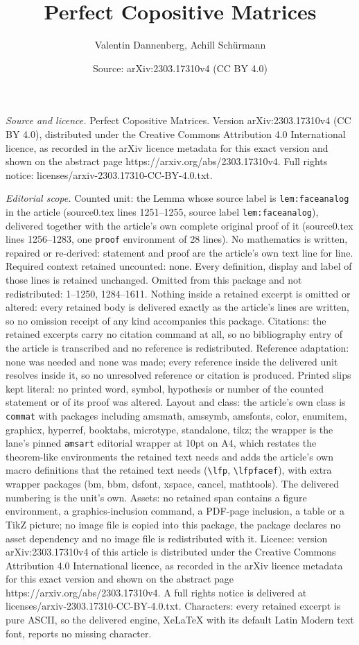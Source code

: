 \documentclass[10pt,a4paper]{amsart}
\title[Perfect Copositive Matrices]{Perfect Copositive Matrices}
\author{Valentin Dannenberg, Achill Sch\"urmann}
\date{Source: arXiv:2303.17310v4 (CC BY 4.0)}
\begin{document}
\maketitle

\noindent\emph{Source and licence.} Perfect Copositive Matrices. Version arXiv:2303.17310v4 (CC BY 4.0), distributed under the Creative Commons Attribution 4.0 International licence, as recorded in the arXiv licence metadata for this exact version and shown on the abstract page https://arxiv.org/abs/2303.17310v4. Full rights notice: licenses/arxiv-2303.17310-CC-BY-4.0.txt.\par\smallskip

\noindent\textit{Editorial scope.} Counted unit: the Lemma whose source label is \texttt{lem:faceanalog} in the article (source0.tex lines 1251--1255, source label \texttt{lem:faceanalog}), delivered together with the article's own complete original proof of it (source0.tex lines 1256--1283, one \texttt{proof} environment of 28 lines). No mathematics is written, repaired or re-derived: statement and proof are the article's own text line for line. Required context retained uncounted: none. Every definition, display and label of those lines is retained unchanged. Omitted from this package and not redistributed: 1--1250, 1284--1611. Nothing inside a retained excerpt is omitted or altered: every retained body is delivered exactly as the article's lines are written, so no omission receipt of any kind accompanies this package. Citations: the retained excerpts carry no citation command at all, so no bibliography entry of the article is transcribed and no reference is redistributed. Reference adaptation: none was needed and none was made; every reference inside the delivered unit resolves inside it, so no unresolved reference or citation is produced. Printed slips kept literal: no printed word, symbol, hypothesis or number of the counted statement or of its proof was altered. Layout and class: the article's own class is \texttt{commat} with packages including amsmath, amssymb, amsfonts, color, enumitem, graphicx, hyperref, booktabs, microtype, standalone, tikz; the wrapper is the lane's pinned \texttt{amsart} editorial wrapper at 10pt on A4, which restates the theorem-like environments the retained text needs and adds the article's own macro definitions that the retained text needs (\texttt{\textbackslash lfp}, \texttt{\textbackslash lfpfacef}), with extra wrapper packages (bm, bbm, dsfont, xspace, cancel, mathtools). The delivered numbering is the unit's own. Assets: no retained span contains a figure environment, a graphics-inclusion command, a PDF-page inclusion, a table or a TikZ picture; no image file is copied into this package, the package declares no asset dependency and no image file is redistributed with it. Licence: version arXiv:2303.17310v4 of this article is distributed under the Creative Commons Attribution 4.0 International licence, as recorded in the arXiv licence metadata for this exact version and shown on the abstract page https://arxiv.org/abs/2303.17310v4. A full rights notice is delivered at licenses/arxiv-2303.17310-CC-BY-4.0.txt. Characters: every retained excerpt is pure ASCII, so the delivered engine, XeLaTeX with its default Latin Modern text font, reports no missing character.
\end{document}
